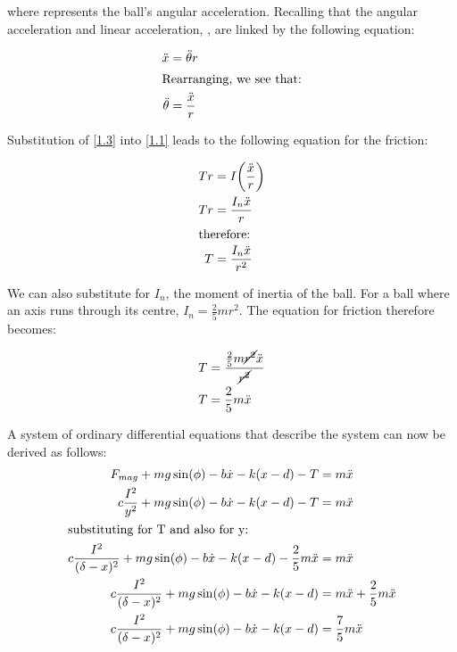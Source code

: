 \documentclass[a4paper,10pt,reqno]{amsart}
\numberwithin{equation}{section}
\begin{document}
\newline where \ddot{\theta} represents the ball's angular acceleration. Recalling that the angular acceleration and linear acceleration, , are linked by the following equation:

\begin{align}
\ddot{x} &= \ddot{\theta}r \label{1.2} \\
\intertext{Rearranging, we see that:}
\ddot{\theta} &= \frac{\ddot{x}}{r} \label{1.3}
\end{align}

\newline Substitution of \ref{1.3} into \ref{1.1} leads to the following equation for the friction:

\begin{align}
Tr &= I\bigg(\frac{\ddot{x}}{r}\bigg)\nonumber\\ 
Tr &= \frac{I_n\ddot{x}}{r} \nonumber \\ 
\intertext{therefore:}
T &= \frac{I_n\ddot{x}}{r^2} \label{1.4}
\end{align}

\newline We can also substitute for $I_n$, the moment of inertia of the ball. 
\newline For a ball where an axis runs through its centre, $I_n = \frac{2}{5}mr^2$.
\newline The equation for friction therefore becomes:

\begin{align}
T &= \frac{\frac{2}{5}m\cancel{r^2}\ddot{x}}{\cancel{r^2}} \nonumber \\
T &= \frac{2}{5}m\ddot{x} \label{1.5}
\end{align}
\vspace{3mm}

\newline A system of ordinary differential equations that describe the system can now be derived as follows:
\begin{align}
F_{mag} + mg\sin(\phi) - b\dot{x} - k(x - d) - T &= m\ddot{x} \nonumber \\
c \frac{I^2}{y^2} + mg\sin(\phi) - b\dot{x} - k(x - d) - T &= m\ddot{x} \nonumber \\
\intertext{substituting for T and also for y:}
c \frac{I^2}{(\delta - x)^2} + mg\sin(\phi) - b\dot{x} - k(x - d) - \frac{2}{5}m\ddot{x} &= m\ddot{x} \nonumber \\
c \frac{I^2}{(\delta - x)^2} + mg\sin(\phi) - b\dot{x} - k(x - d) &= m\ddot{x} + \frac{2}{5}m\ddot{x}\nonumber \\
c \frac{I^2}{(\delta - x)^2} + mg\sin(\phi) - b\dot{x} - k(x - d) &= \frac{7}{5}m\ddot{x}\nonumber
\end{align}
\end{document}

